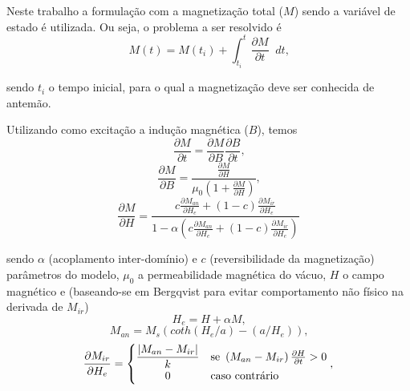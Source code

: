 \documentclass{homeworg}
\newcommand{\dx}{\mathop{}\!{d}}
\begin{document}
\hspace{1cm} Neste trabalho a formulação com a magnetização total ($M$) sendo a variável de estado é utilizada. Ou seja, o problema a ser resolvido é
\begin{equation}
  M(t) = M(t_i) + \int_{t_i}^{t} \frac{\partial M}{\partial t} \dx t \text{,}
\end{equation}

sendo $t_i$ o tempo inicial, para o qual a magnetização deve ser conhecida de antemão.

\hspace{1cm} Utilizando como excitação a indução magnética ($B$), temos \cite{dular, joe}
\begin{equation}
  \frac{\partial M}{\partial t} = \frac{\partial M}{\partial B} \frac{\partial B}{\partial t} \text{,}
\end{equation}
\begin{equation}
  \frac{\partial M}{\partial B} = \frac{\displaystyle \frac{\partial M}{\partial H}}{\displaystyle \mu_0 \left(1 + \frac{\partial M}{\partial H}\right)} \text{,}
\end{equation}
\begin{equation}
  \frac{\partial M}{\partial H} = \frac{\displaystyle c\frac{\partial M_{an}}{\partial H_e} + (1-c)\frac{\partial M_{ir}}{\partial H_e}}
  {\displaystyle
  1 - \alpha \left( c\frac{\partial M_{an}}{\partial H_e} + (1-c)\frac{\partial M_{ir}}{\partial H_e}\right)}
\end{equation}

sendo $\alpha$ (acoplamento inter-domínio) e $c$ (reversibilidade da magnetização) parâmetros do modelo, $\mu_0$ a permeabilidade magnética do vácuo, $H$ o campo magnético e (baseando-se em Bergqvist \cite{dular} para evitar comportamento não físico na derivada de $M_{ir}$)
\begin{equation}
  H_e = H + \alpha M \text{,}
\end{equation}
\begin{equation}
  M_{an} = M_s \left(coth(H_e/a) - (a/H_e)\right) \text{,}
\end{equation}
\begin{equation} \label{dmir}
  \frac{\partial M_{ir}}{\partial H_e} = \begin{cases}
    \displaystyle \frac{\lvert M_{an} - M_{ir} \rvert}{k} & \text{se } \left(M_{an} - M_{ir}\right) \frac{\partial H}{\partial t} > 0 \\
    \displaystyle\hfil 0 & \text{caso contrário}
  \end{cases} \text{,}
\end{equation}
\end{document}
